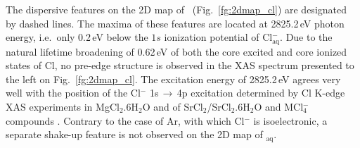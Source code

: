 The dispersive features on the 2D map of \cli~(Fig.\ \ref{fg:2dmap_cl}) are designated by dashed lines. The maxima of these features are located at 2825.2\,eV photon energy, i.e.\ only 0.2\,eV below the $1s$ ionization potential of Cl$^{-}_{\text{aq}}$. Due to the natural lifetime broadening of 0.62\,eV \citep{Krause79:329} of both the core excited and core ionized states of Cl, no pre-edge structure is observed in the XAS spectrum presented to the left on Fig.\ \ref{fg:2dmap_cl}. The excitation energy of 2825.2\,eV agrees very well with the position of the Cl$^{-}$ 1s$\,\rightarrow\,$4p excitation determined by Cl K-edge XAS experiments in MgCl$_2$.6H$_2$O and of SrCl$_2$/SrCl$_2$.6H$_2$O \citep{sugiura82:681} and MCl$_{4}^{-}$ compounds \citep{shadle95:2259}. Contrary to the case of Ar, with which Cl$^{-}$ is isoelectronic, a separate shake-up feature is not observed on the 2D map of \cli$_{\text{aq}}$.




